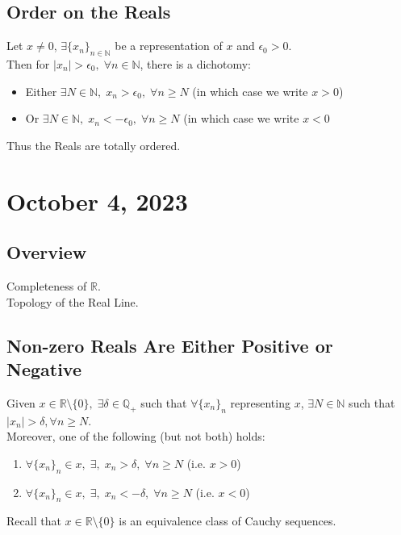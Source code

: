 \documentclass[11pt]{article}
\newcommand{\0}{\emptyset}
\newcommand{\N}{\mathbb{N}}
\newcommand{\Q}{\mathbb{Q}}
\newcommand{\R}{\mathbb{R}}
\begin{document}
\subsection*{Order on the Reals}
\label{sec:org917d6d8}
Let \(x\neq 0\), \(\exists\{x_{n}\}_{n\in\N}\) be a representation of \(x\) and \(\epsilon_{0}>0\).\\[0pt]
Then for \(|x_{n}|>\epsilon_{0},\;\forall n\in\N\), there is a dichotomy:\\[0pt]
\begin{itemize}
\item Either \(\exists N\in\N,\;x_{n}>\epsilon_{0},\;\forall n\geq N\) (in which case we write \(x>0\))\\[0pt]
\item Or \(\exists N\in\N,\;x_{n}<-\epsilon_{0},\;\forall n\geq N\) (in which case we write \(x<0\)\\[0pt]
\end{itemize}
Thus the Reals are totally ordered.\\[0pt]
\section*{October 4, 2023}
\label{sec:org4263b48}
\subsection*{Overview}
\label{sec:org5256703}
Completeness of \(\R\).\\[0pt]
Topology of the Real Line.\\[0pt]
\subsection*{Non-zero Reals Are Either Positive or Negative}
\label{sec:org8d6753b}
Given \(x\in\R\setminus\{0\},\;\exists\delta\in\Q_{+}\) such that \(\forall\{x_{n}\}_{n}\) representing \(x\), \(\exists N\in\N\) such that \(|x_{n}|>\delta,\forall n\geq N\).\\[0pt]
Moreover, one of the following (but not both) holds:\\[0pt]
\begin{enumerate}
\item \(\forall\{x_{n}\}_{n}\in x,\;\exists,\;x_{n}>\delta,\;\forall n\geq N\) (i.e. \(x>0\))\\[0pt]
\item \(\forall\{x_{n}\}_{n}\in x,\;\exists,\;x_{n}<-\delta,\;\forall n\geq N\) (i.e. \(x<0\))\\[0pt]
\end{enumerate}
Recall that \(x\in\R\setminus\{0\}\) is an equivalence class of Cauchy sequences.\\[0pt]
\end{document}
